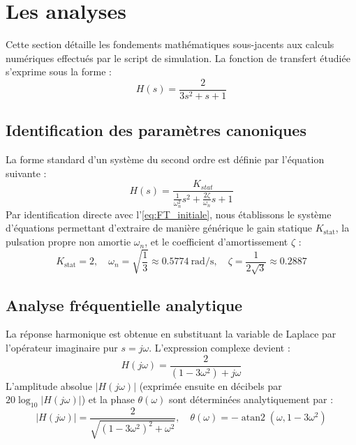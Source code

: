 \documentclass[11pt,a4paper]{article}
\begin{document}
\section{Les analyses}

Cette section détaille les fondements mathématiques sous-jacents aux calculs numériques effectués par le script de simulation. La fonction de transfert étudiée s'exprime sous la forme :
\begin{equation}
    H(s) = \frac{2}{3s^2 + s + 1}
    \label{eq:FT_initiale}
\end{equation}

\subsection{Identification des paramètres canoniques}
La forme standard d'un système du second ordre est définie par l'équation suivante :
\begin{equation}
    H(s) = \frac{K_{stat}}{\frac{1}{\omega_n^2}s^2 + \frac{2\zeta}{\omega_n}s + 1}
\end{equation}
Par identification directe avec l'\cref{eq:FT_initiale}, nous établissons le système d'équations permettant d'extraire de manière générique le gain statique $K_{\mathrm{stat}}$, la pulsation propre non amortie $\omega_n$, et le coefficient d'amortissement $\zeta$ :
\begin{equation}
    K_{\mathrm{stat}} = 2, \quad \omega_n = \sqrt{\frac{1}{3}} \approx \qty{0.5774}{\radian\per\second}, \quad \zeta = \frac{1}{2\sqrt{3}} \approx 0.2887
\end{equation}

\subsection{Analyse fréquentielle analytique}
La réponse harmonique est obtenue en substituant la variable de Laplace par l'opérateur imaginaire pur $s = j\omega$. L'expression complexe devient :
\begin{equation}
    H(j\omega) = \frac{2}{(1 - 3\omega^2) + j\omega}
\end{equation}
L'amplitude absolue $|H(j\omega)|$ (exprimée ensuite en décibels par $20\log_{10}|H(j\omega)|$) et la phase $\theta(\omega)$ sont déterminées analytiquement par :
\begin{equation}
    |H(j\omega)| = \frac{2}{\sqrt{(1 - 3\omega^2)^2 + \omega^2}}, \quad \theta(\omega) = -\operatorname{atan2}(\omega, 1 - 3\omega^2)
\end{equation}
\end{document}
